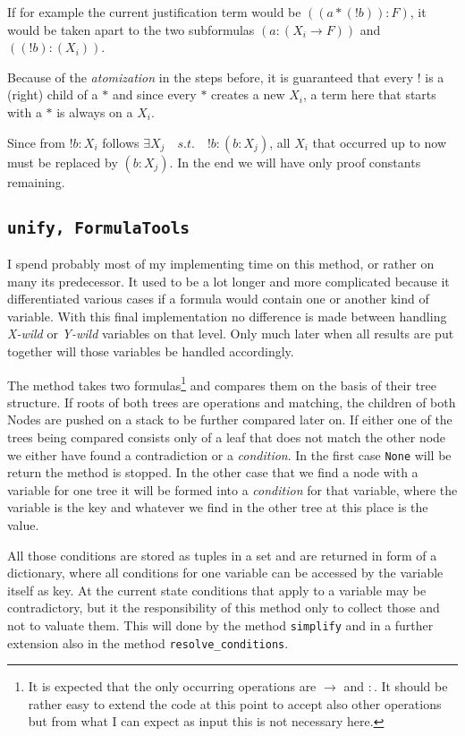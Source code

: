 If for example the current justification term would be $((a*(!b)):F)$, it would be taken apart to the two subformulas $(a:(X_i\rightarrow F))$ and $((!b):(X_i))$.

Because of the \emph{atomization} in the steps before, it is guaranteed that every $!$ is a (right) child of a  $*$ and since every $*$ creates a new $X_i$, a term here that starts with a $*$ is always on a $X_i$. 

Since from $!b:X_i$ follows $\exists X_j \quad s.t. \quad !b:(b:X_j)$, all $X_i$ that occurred up to now must be replaced by $(b:X_j)$. In the end we will have only proof constants remaining.

\subsection[unify]{\texttt{unify, FormulaTools}}
I spend probably most of my implementing time on this method, or rather on many its predecessor. It used to be a lot longer and more complicated because it differentiated various cases if a formula would contain one or another kind of variable.
With this final implementation no difference is made between handling \emph{X-wild} or \emph{Y-wild} variables on that level. Only much later when all results are put together will those variables be handled accordingly.

The method takes two formulas\footnote{It is expected that the only occurring operations are $\rightarrow$ and $:$. It should be rather easy to extend the code at this point to accept also other operations but from what I can expect as input this is not necessary here.} and compares them on the basis of their tree structure. If roots of both trees are operations and matching, the children of both Nodes are pushed on a stack to be further compared later on. If either one of the trees being compared consists only of a leaf that does not match the other node we either have found a contradiction or a \emph{condition}. In the first case \texttt{None} will be return the method is stopped. In the other case that we find a node with a variable for one tree it will be formed into a \emph{condition} for that variable, where the variable is the key and whatever we find in the other tree at this place is the value.

All those conditions are stored as tuples in a set and are returned in form of a dictionary, where all conditions for one variable can be accessed by the variable itself as key. At the current state conditions that apply to a variable may be contradictory, but it the responsibility of this method only to collect those and not to valuate them. This will done by the method \texttt{simplify} and in a further extension also in the method \texttt{resolve\_conditions}.

